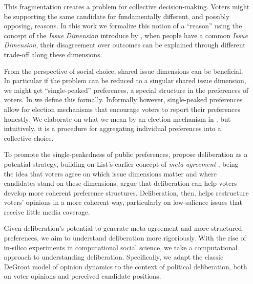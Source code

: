 This fragmentation creates a problem for collective decision-making. Voters
might be supporting the same candidate for fundamentally different, and
possibly opposing, reasons. In this work we formalize this notion of a ``reason''
using the concept of the \textit{Issue Dimension} introduce by
\citet{listTwoConceptsAgreement2002}, when people have a common \textit{Issue
	Dimension}, their disagreement over outcomes can be explained
through different trade-off along these dimensions.

From the perspective of social choice, shared issue dimensions can be
beneficial. In particular if the problem can be reduced to a singular shared
issue dimension,  we might get ``single-peaked'' preferences, a special
structure in the preferences of voters.  In  we define this
formally. Informally however, single-peaked preferences allow for election mechanisms
that encourage voters to report their preferences honestly. We elaborate on
what we mean by an election mechanism in , but
intuitively, it is a procedure for aggregating individual preferences into a
collective choice.

To promote the single-peakedness of public preferences,
\citet{listDeliberationSinglePeakednessPossibility2013} propose deliberation as
a potential strategy, building on List's earlier concept of
\emph{meta-agreement} \cite{listTwoConceptsAgreement2002}, being the idea that
voters agree on which issue dimensions matter and where candidates stand
on these dimensions. \citet{listDeliberationSinglePeakednessPossibility2013} argue that deliberation can help voters
develop more coherent preference structures. Deliberation, then, helps
restructure voters' opinions in a more coherent way, particularly on
low-salience issues that receive little media coverage.

Given deliberation's potential to generate meta-agreement and more structured
preferences, we aim to understand deliberation more rigoriously.  With the rise
of in-silico experiments in computational social science, we take a
computational approach to understanding deliberation. Specifically, we adapt
the classic DeGroot model of opinion dynamics
\cite{degrootReachingConsensus1974} to the context of political deliberation,
both on voter opinions and perceived candidate positions.

